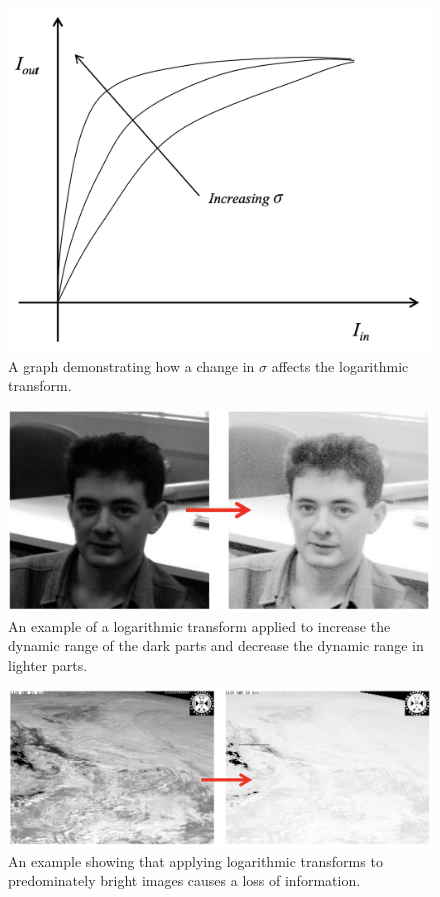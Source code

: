 \begin{figure}
    \centering
    \includegraphics[width=0.5\linewidth]{images/log-scaling-factor.png}
    \caption{A graph demonstrating how a change in $\sigma$ affects the logarithmic transform.}
    \label{fig:log-scaling-factor}
\end{figure}

\begin{figure}
    \centering
    \includegraphics[width=0.8\linewidth]{images/log-transform-1.png}
    \caption{An example of a logarithmic transform applied to increase the dynamic range of the dark parts and decrease the dynamic range in lighter parts.}
    \label{fig:log-transform-1}
\end{figure}

\begin{figure}
    \centering
    \includegraphics[width=0.8\linewidth]{images/log-transform-2.png}
    \caption{An example showing that applying logarithmic transforms to predominately bright images causes a loss of information.}
    \label{fig:log-transform-2}
\end{figure}

